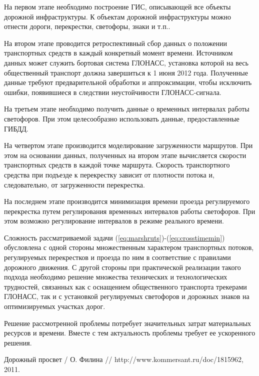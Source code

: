 \documentclass[a4paper,13pt]{article}
\begin{document}
На первом этапе необходимо построение ГИС, описывающей все объекты дорожной инфраструктуры. К объектам дорожной инфраструктуры можно отнести дороги, перекрестки, светофоры, знаки и т.п..

На втором этапе проводится ретроспективный сбор данных о положении транспортных средств в каждый конкретный момент времени. Источником данных может служить бортовая система ГЛОНАСС, установка которой на весь общественный транспорт должна завершиться к 1 июня 2012 года. Полученные данные требуют предварительной обработки и аппроксимации, чтобы исключить ошибки, появившиеся в следствии неустойчивости ГЛОНАСС-сигнала.

На третьем этапе необходимо получить данные о временных интервалах работы светофоров. При этом целесообразно использовать данные, предоставленные ГИБДД.

На четвертом этапе производится моделирование загруженности маршрутов. При этом на основании данных, полученных на втором этапе вычисляется скорости транспортных средств в каждой точке маршрута. Скорость транспортного средства при подъезде к перекрестку зависит от плотности потока и, следовательно, от загруженности перекрестка. 

На последнем этапе производится минимизация времени проезда регулируемого перекрестка путем регулирования временных интервалов работы светофоров. При этом возможно регулирование интервалов в режиме реального времени.

Сложность рассматриваемой задачи (\ref{eq:marshruts})-(\ref{eq:crosstimemin}) обусловлена с одной стороны множественным характером транспортных потоков, регулируемых перекрестков и проезда по ним в соответствие с правилами дорожного движения. С другой стороны при практической реализации такого подхода необходимо решение множества технических и технологических трудностей, связанных как с оснащением общественного транспорта трекерами ГЛОНАСС, так и с установкой регулируемых светофоров и дорожных знаков на оптимизируемых участках дорог.

Решение рассмотренной проблемы потребует значительных затрат материальных ресурсов и времени. Вместе с тем актуальность проблемы требует ее ускоренного решения.

\begin{thebibliography}{1}
Дорожный просвет / О. Филина // http://www.kommersant.ru/doc/1815962, 2011.
\end{thebibliography}
\end{document}
